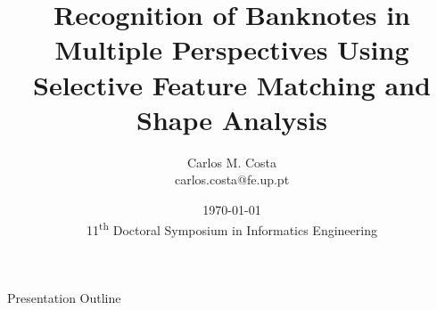 





\title{Recognition of Banknotes in Multiple Perspectives Using Selective Feature Matching and Shape Analysis}
\author{Carlos M. Costa\texorpdfstring{\\{\ttfamily carlos.costa@fe.up.pt}}{}}
\date{\today\\{\small 11\textsuperscript{th} Doctoral Symposium in Informatics Engineering}}



\begin{frame}
	\titlepage
\end{frame}




\begin{frame}{Presentation Outline}
	\tableofcontents
\end{frame}












